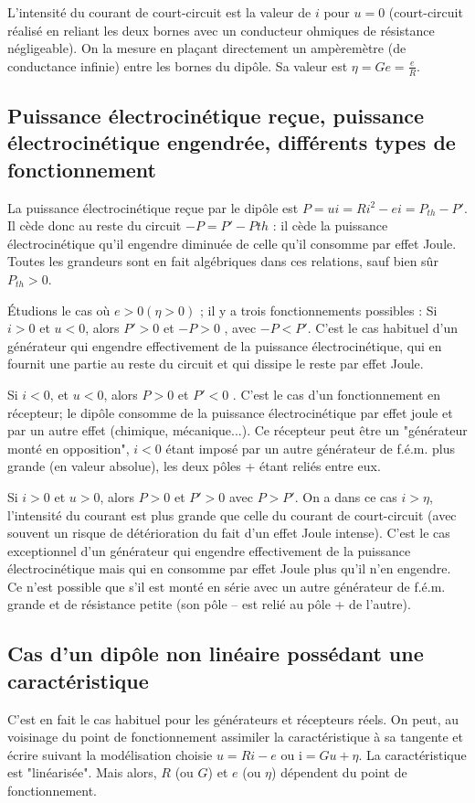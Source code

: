 L'intensité du courant de court-circuit est la valeur de $i$ pour $u = 0$
(court-circuit réalisé en reliant les deux bornes avec un conducteur ohmiques de
résistance négligeable). On la mesure en plaçant directement un ampèremètre (de
conductance infinie) entre les bornes du dipôle. Sa valeur est $\eta = Ge =
\frac{e}{R}$.
\subsection{Puissance électrocinétique reçue, puissance électrocinétique
engendrée, différents types de fonctionnement}

La puissance électrocinétique reçue par le dipôle est  $P  = u i = R i^2 - e i = P_{th} - P'$. Il cède donc au reste du circuit  $-P  = P' -P{th}$ : il cède la puissance électrocinétique qu'il engendre diminuée de celle qu'il consomme par effet Joule. Toutes les grandeurs sont en fait algébriques dans ces relations, sauf  bien sûr $P_{th} > 0$.
	
Étudions le cas où $e > 0 (\eta > 0)$ ; il y a trois fonctionnements possibles :
Si $i > 0$  et $u < 0$, alors $P'> 0$ et $-P  > 0$ , avec $-P  < P'$. C'est le cas habituel d'un générateur qui engendre effectivement de la puissance électrocinétique, qui en fournit une partie au reste du circuit et qui dissipe le reste par effet Joule.

Si $i < 0$, et $u < 0$, alors $P > 0$ et $P' < 0$ . C'est le cas d'un fonctionnement en récepteur; le dipôle consomme de la puissance électrocinétique par effet joule et par un autre effet (chimique, mécanique...). Ce récepteur peut être un "générateur monté en opposition", $i < 0$ étant imposé par un autre générateur de f.é.m. plus grande (en valeur absolue), les deux pôles + étant reliés entre eux.

Si $i > 0$ et $u > 0$, alors $P > 0$ et $P' > 0$ avec  $P > P'$. On a dans ce cas $i > \eta$, l'intensité du courant est plus grande que celle du courant de court-circuit (avec souvent un risque de détérioration du fait d'un effet Joule intense). C'est le cas exceptionnel d'un générateur qui engendre effectivement de la puissance électrocinétique mais qui en consomme par effet Joule plus qu'il n'en engendre.  Ce n'est possible que s'il est monté en série avec un autre générateur de f.é.m. grande et de résistance petite (son pôle – est relié au pôle + de l'autre).
\subsection{Cas d'un dipôle non linéaire possédant une caractéristique}
C'est en fait le cas habituel pour les générateurs et récepteurs réels. On peut, au voisinage du point de fonctionnement assimiler la caractéristique à sa tangente et écrire suivant la modélisation choisie $u = R i - e$ ou i$ = G u + \eta$. La caractéristique est "linéarisée". Mais alors, $R$ (ou $G$) et $e$ (ou $\eta$) dépendent du point de fonctionnement.

